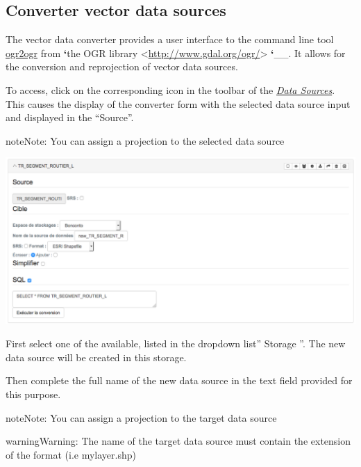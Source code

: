 \documentclass[letterpaper,10pt,english]{sphinxmanual}
\begin{document}
\subsection{Converter vector data sources}
\label{data/processing:convertisseur-de-sources-de-donnees-vectorielles}
The vector data converter provides a user interface to the command line tool  \href{http://www.gdal.org/ogr2ogr.html}{ogr2ogr} from  {\color{red}\bfseries{}{}`}the OGR library \textless{}\href{http://www.gdal.org/ogr/}{http://www.gdal.org/ogr/}\textgreater{} {\color{red}\bfseries{}{}`}\_\_. It allows for the conversion and reprojection of vector data sources.

To access, click on the corresponding icon in the toolbar of the {\hyperref[data/datasources::doc]{\emph{\emph{Data Sources}}}}. This causes the display of the converter form with the selected data source input and displayed in the ``Source''.

\begin{notice}{note}{Note:}
You can assign a projection to the selected data source
\end{notice}

\includegraphics[width=1.000\linewidth]{vector-converter-window.png}

First select one of the  available, listed in the dropdown list'' Storage ''. The new data source will be created in this storage.

Then complete the full name of the new data source in the text field provided for this purpose.

\begin{notice}{note}{Note:}
You can assign a projection to the target data source
\end{notice}

\begin{notice}{warning}{Warning:}
The name of the target data source must contain the extension of the format (i.e mylayer.shp)
\end{notice}
\end{document}
